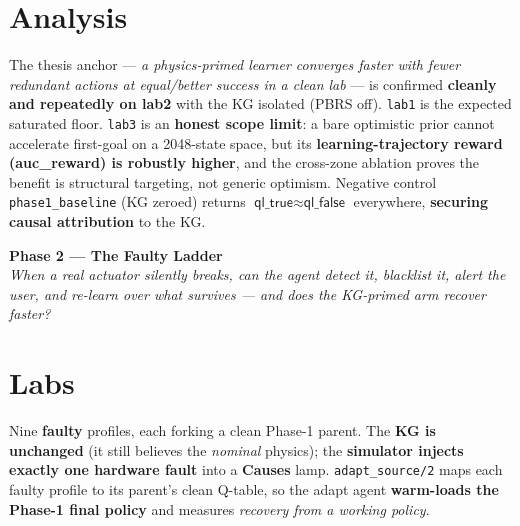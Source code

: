 \documentclass[10pt,a4paper]{article}
\newcommand{\file}[1]{\texttt{\small #1}}
\newcommand{\kw}[1]{\textbf{#1}}
\begin{document}
\section{Analysis}
The thesis anchor — \emph{a physics-primed learner converges faster with fewer redundant actions at
equal/better success in a clean lab} — is confirmed \kw{cleanly and repeatedly on lab2} with the KG
isolated (PBRS off). \file{lab1} is the expected saturated floor. \file{lab3} is an \kw{honest scope
limit}: a bare optimistic prior cannot accelerate first-goal on a 2048-state space, but its
\kw{learning-trajectory reward (auc\_reward) is robustly higher}, and the cross-zone ablation proves the
benefit is structural targeting, not generic optimism. Negative control \file{phase1\_baseline}
(KG zeroed) returns \(\textsf{ql\_true}\approx\textsf{ql\_false}\) everywhere, \kw{securing causal attribution} to the KG.

\clearpage
\begin{center}
  {\Large\bfseries Phase 2 — The Faulty Ladder}\\[1pt]
  {\footnotesize \emph{When a real actuator silently breaks, can the agent detect it, blacklist it,
  alert the user, and re-learn over what survives — and does the KG-primed arm recover faster?}}
\end{center}
\vspace{-2pt}

\section{Labs}
Nine \kw{faulty} profiles, each forking a clean Phase-1 parent. The \kw{KG is unchanged} (it still
believes the \emph{nominal} physics); the \kw{simulator injects exactly one hardware fault} into a
\kw{Causes} lamp. \file{adapt\_source/2} maps each faulty profile to its parent's clean Q-table, so the
adapt agent \kw{warm-loads the Phase-1 final policy} and measures \emph{recovery from a working policy}.
\end{document}
